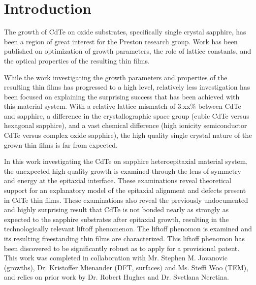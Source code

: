 \section{Introduction}
The growth of CdTe on oxide substrates, specifically single crystal sapphire, has been a 
region of great interest for the Preston research group. Work has been published on 
optimization of growth parameters, the role of lattice constants, and the optical 
properties of the resulting thin films\cite{Neretina2009a,Neretina2008b,Neretina2009b,Neretina2007,Neretina2006,cdte-optical}.

While the work investigating the growth parameters and properties of the resulting thin 
films has progressed to a high level, relatively less investigation has been focused on 
explaining the surprising success that has been achieved with this material system. With 
a relative lattice mismatch of 3.xx\% between CdTe and sapphire, a difference in the 
crystallographic space group (cubic CdTe versus hexagonal sapphire), and a vast chemical 
difference (high ionicity semiconductor CdTe versus complex oxide sapphire), the high 
quality single crystal nature of the grown thin films is far from expected.

In this work investigating the CdTe on sapphire heteroepitaxial material system, the 
unexpected high quality growth is examined through the lens of symmetry and energy at the 
epitaxial 
interface. These examinations reveal theoretical support for an explanatory model of the 
epitaxial alignment 
and defects present in CdTe thin films. These examinations also reveal the previously 
undocumented and highly surprising result that CdTe is not bonded nearly as strongly as 
expected to the sapphire substrates after epitaxial growth, resulting in the 
technologically relevant liftoff phenomenon. The liftoff phenomon is examined and its 
resulting freestanding thin films are characterized. This liftoff phenomon has been 
discovered to be significantly robust as to apply for a provisional patent\cite{patent}. 
This work was completed in collaboration 
with Mr. Stephen M. Jovanovic (growths), Dr. Kristoffer Mienander (DFT, surfaces) and Ms. 
Steffi Woo (TEM), and relies on prior work by Dr. Robert Hughes and Dr. Svetlana Neretina.

